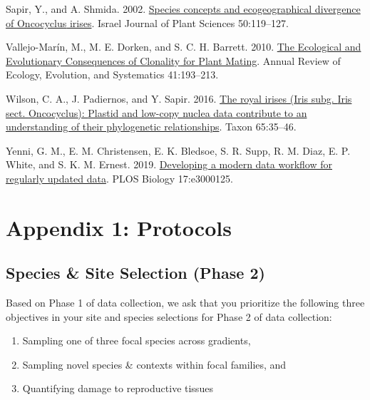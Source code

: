 \documentclass[
  letterpaper,
  oneside,
  open=any]{scrbook}
\providecommand{\tightlist}{%
  \setlength{\itemsep}{0pt}\setlength{\parskip}{0pt}}\usepackage{longtable,booktabs,array}
\newlength{\cslhangindent}
\newenvironment{CSLReferences}[2] %
 {\begin{list}{}{%
  \setlength{\itemindent}{0pt}
  \setlength{\leftmargin}{0pt}
  \setlength{\parsep}{0pt}
  \ifodd #1
   \setlength{\leftmargin}{\cslhangindent}
   \setlength{\itemindent}{-1\cslhangindent}
  \fi
  \setlength{\itemsep}{#2\baselineskip}}}
 {\end{list}}
\begin{document}
\begin{CSLReferences}{1}{0}
Sapir, Y., and A. Shmida. 2002.
\href{https://doi.org/10.1560/DJXH-QX0M-5P0H-DLMW}{Species concepts and
ecogeographical divergence of {Oncocyclus} irises}. Israel Journal of
Plant Sciences 50:119--127.

Vallejo-Marín, M., M. E. Dorken, and S. C. H. Barrett. 2010.
\href{https://doi.org/10.1146/annurev.ecolsys.110308.120258}{The
{Ecological} and {Evolutionary Consequences} of {Clonality} for {Plant
Mating}}. Annual Review of Ecology, Evolution, and Systematics
41:193--213.

Wilson, C. A., J. Padiernos, and Y. Sapir. 2016.
\href{https://doi.org/10.12705/651.3}{The royal irises ({Iris} subg.
{Iris} sect. {Oncocyclus}): {Plastid} and low-copy nuclea data
contribute to an understanding of their phylogenetic relationships}.
Taxon 65:35--46.

Yenni, G. M., E. M. Christensen, E. K. Bledsoe, S. R. Supp, R. M. Diaz,
E. P. White, and S. K. M. Ernest. 2019.
\href{https://doi.org/10.1371/journal.pbio.3000125}{Developing a modern
data workflow for regularly updated data}. PLOS Biology 17:e3000125.

\end{CSLReferences}

\part{Appendix 1: Protocols}

\chapter{Species \& Site Selection (Phase 2)}\label{sec-species_site}

Based on Phase 1 of data collection, we ask that you prioritize the
following three objectives in your site and species selections for Phase
2 of data collection:

\begin{enumerate}
\def\labelenumi{(\arabic{enumi})}
\tightlist
\item
  Sampling one of three focal species across gradients,\\
\item
  Sampling novel species \& contexts within focal families, and
\item
  Quantifying damage to reproductive tissues
\end{enumerate}
\end{document}
